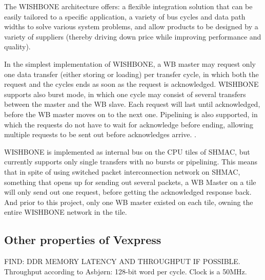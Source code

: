 The WISHBONE architecture offers: a flexible integration solution that can be easily tailored to a specific application, a variety of bus cycles and data path widths to solve various system problems, and allow products to be designed by a variety of suppliers (thereby driving down price while improving performance and quality).

In the simplest implementation of WISHBONE, a WB master may request only one data transfer (either storing or loading) per transfer cycle, in which both the request and the cycles ends as soon as the request is acknowledged.
WISHBONE supports also burst mode, in which one cycle may consist of several transfers between the master and the WB slave.
Each request will last until acknowledged, before the WB master moves on to the next one.
Pipelining is also supported, in which the requests do not have to wait for acknowledge before ending, allowing multiple requests to be sent out before acknowledges arrive.
\cite{WISHBONE}.

WISHBONE is implemented as internal bus on the CPU tiles of SHMAC, but currently supports only single transfers with no bursts or pipelining.
This means that in spite of using switched packet interconnection network on SHMAC, something that opens up for sending out several packets, a WB Master on a tile will only send out one request, before getting the acknowledged response back.
\cite{Yaman}
And prior to this project, only one WB master existed on each tile, owning the entire WISHBONE network in the tile.

\subsection{Other properties of Vexpress}
FIND: DDR MEMORY LATENCY AND THROUGHPUT IF POSSIBLE.
Throughput according to Asbjørn: 128-bit word per cycle.
Clock is a 50MHz.